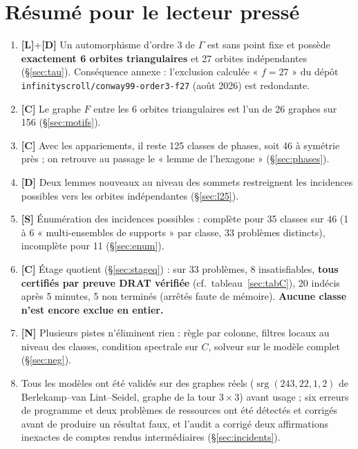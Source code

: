 \documentclass[11pt,a4paper]{article}
\theoremstyle{remark}
\newcommand{\srg}{\operatorname{srg}}
\newcommand{\st}[1]{\textbf{[#1]}}
\newcommand{\code}[1]{\texttt{#1}}
\begin{document}
\section{Résumé pour le lecteur pressé}
\begin{enumerate}[nosep]
\item \st{L}+\st{D} Un automorphisme d'ordre 3 de $\Gamma$ est sans point fixe et possède \textbf{exactement 6 orbites triangulaires} et 27 orbites indépendantes
(§\ref{sec:tau}). Conséquence annexe : l'exclusion calculée « $f=27$ » du dépôt \code{infinityscroll/conway99-order3-f27} (août 2026) est redondante.
\item \st{C} Le graphe $F$ entre les 6 orbites triangulaires est l'un de 26 graphes sur 156 (§\ref{sec:motifs}).
\item \st{C} Avec les appariements, il reste 125 classes de phases, soit 46 à symétrie près ; on retrouve au passage le « lemme de l'hexagone » (§\ref{sec:phases}).
\item \st{D} Deux lemmes nouveaux au niveau des sommets restreignent les incidences possibles vers les orbites indépendantes (§\ref{sec:l25}).
\item \st{S} Énumération des incidences possibles : complète pour 35 classes sur 46 (1 à 6 « multi-ensembles de supports » par classe, 33 problèmes distincts), incomplète pour 11 (§\ref{sec:enum}).
\item \st{C} Étage quotient (§\ref{sec:stageq}) : sur 33 problèmes, 8 insatisfiables, \textbf{tous certifiés par preuve DRAT vérifiée}
(cf.\ tableau~\ref{sec:tabC}),
20 indécis après 5 minutes, 5 non terminés (arrêtés faute de mémoire). \textbf{Aucune classe n'est encore exclue en entier.}
\item \st{N} Plusieurs pistes n'éliminent rien : règle par colonne, filtres locaux au niveau des classes, condition spectrale sur $C$, solveur sur le modèle complet (§\ref{sec:neg}).
\item Tous les modèles ont été validés sur des graphes réels ($\srg(243,22,1,2)$ de Berlekamp--van Lint--Seidel, graphe de la tour $3\times3$) avant usage ;
six erreurs de programme et deux problèmes de ressources ont été détectés et corrigés avant de produire un résultat faux, et l'audit a corrigé deux
affirmations inexactes de comptes rendus intermédiaires (§\ref{sec:incidents}).
\end{enumerate}

\end{document}
